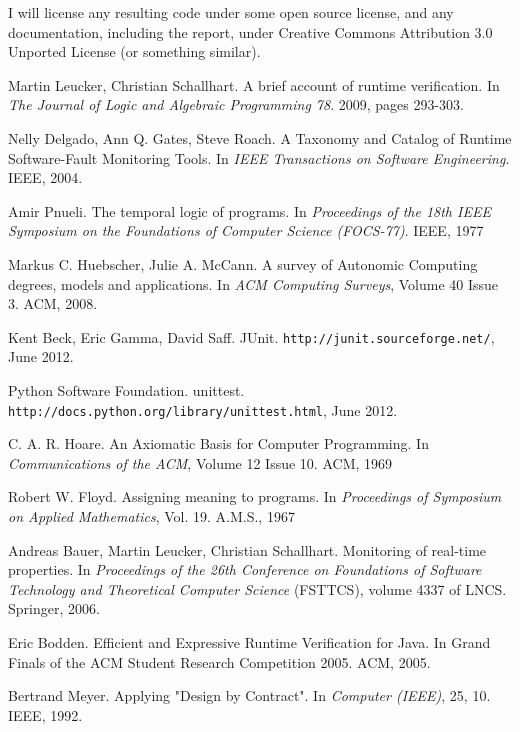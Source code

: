 \documentclass[a4paper,11pt]{article}
\begin{document}
I will license any resulting code under some open source license, and any documentation, including the report, under Creative Commons Attribution 3.0 Unported License \cite{cc-by} (or something similar).


\begin{thebibliography}{99}

	Martin Leucker, Christian Schallhart.
	A brief account of runtime verification.
	In \emph{The Journal of Logic and Algebraic Programming 78}.
	2009, pages 293-303.

	Nelly Delgado, Ann Q. Gates, Steve Roach.
	A Taxonomy and Catalog of Runtime Software-Fault Monitoring Tools.
	In \emph{IEEE Transactions on Software Engineering}.
	IEEE, 2004.

	Amir Pnueli.
	The temporal logic of programs. 
	In \emph{Proceedings of the 18th IEEE Symposium on the Foundations of Computer Science (FOCS-77)}.
	IEEE, 1977

	Markus C. Huebscher, Julie A. McCann.
	A survey of Autonomic Computing \- degrees, models and applications.
	In \emph{ACM Computing Surveys}, Volume 40 Issue 3.
	ACM, 2008.
	
	Kent Beck, Eric Gamma, David Saff.
	JUnit.
	\texttt{http://junit.sourceforge.net/},
	June 2012.

	Python Software Foundation.
	unittest.
	\texttt{http://docs.python.org/library/unittest.html},
	June 2012.

	C. A. R. Hoare.
	An Axiomatic Basis for Computer Programming.
	In \emph{Communications of the ACM}, Volume 12 Issue 10.
	ACM, 1969

	Robert W. Floyd.
	Assigning meaning to programs.
	In \emph{Proceedings of Symposium on Applied Mathematics}, Vol. 19.
	A.M.S., 1967

	Andreas Bauer, Martin Leucker, Christian Schallhart.
	Monitoring of real-time properties.
	In \emph{Proceedings of the 26th Conference on Foundations of Software Technology and Theoretical Computer Science} (FSTTCS), volume 4337 of LNCS.
	Springer, 2006.

	Eric Bodden.
	Efficient and Expressive Runtime Verification for Java.
	In Grand Finals of the ACM Student Research Competition 2005.
	ACM, 2005.

	Bertrand Meyer.
	Applying "Design by Contract".
	In \emph{Computer (IEEE)}, 25, 10.
	IEEE, 1992.
	

\end{thebibliography}
\end{document}

